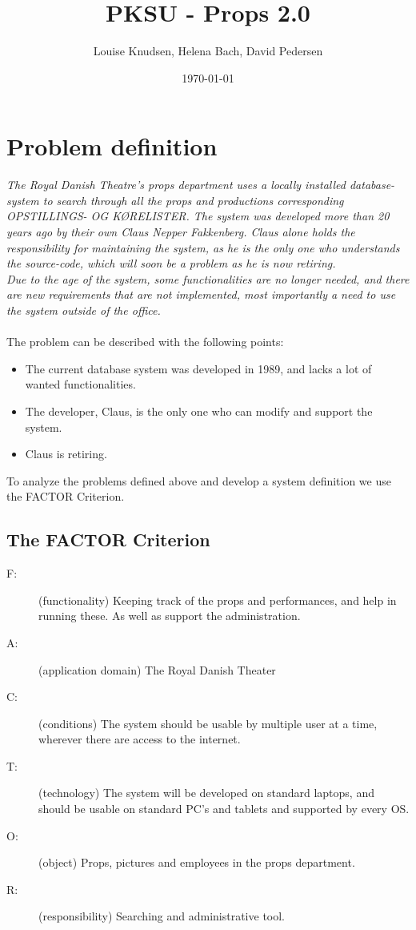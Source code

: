 \documentclass[12pt]{article}
\title{PKSU - Props 2.0}
\author{Louise Knudsen, Helena Bach, David Pedersen}
\date{\today}
\begin{document}
\maketitle
\section{Problem definition}
\textit{The Royal Danish Theatre's props department uses a locally installed database-system to search through all the props and productions corresponding OPSTILLINGS- OG KØRELISTER. The system was developed more than 20 years ago by their own Claus Nepper Fakkenberg. Claus alone holds the responsibility for maintaining the system, as he is the only one who understands the source-code, which will soon be a problem as he is now retiring. \\
Due to the age of the system, some functionalities are no longer needed, and there are new requirements that are not implemented, most importantly a need to use the system outside of the office.} \\\\
The problem can be described with the following points:
\begin{itemize}
\item The current database system was developed in 1989, and lacks a lot of wanted functionalities.
\item The developer, Claus, is the only one who can modify and support the system.
\item Claus is retiring.
\end{itemize}
To analyze the problems defined above and develop a system definition we use the FACTOR Criterion.
\subsection{The FACTOR Criterion}
\begin{description}
\item[F:] (functionality) Keeping track of the props and performances, and help in running these. As well as support the administration. 
\item[A:] (application domain) The Royal Danish Theater 
\item[C:] (conditions) The system should be usable by multiple user at a time, wherever there are access to the internet. 
\item[T:] (technology) The system will be developed on standard laptops, and should be usable on standard PC's and tablets and supported by every OS. 
\item[O:] (object) Props, pictures and employees in the props department. 
\item[R:](responsibility) Searching and administrative tool.
\end{description}
\end{document}
